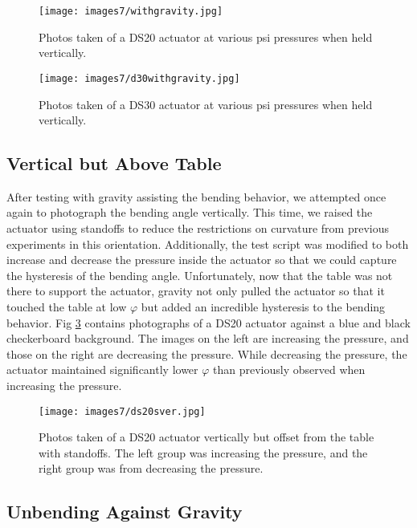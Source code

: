 \begin{figure}[h]
    \centering
     \texttt{[image: images7/withgravity.jpg]}
    \caption{Photos taken of a DS20 actuator at various psi pressures when held vertically.}
    \label{fig:withgravity}
\end{figure}

\begin{figure}[h]
    \centering
     \texttt{[image: images7/d30withgravity.jpg]}
    \caption{Photos taken of a DS30 actuator at various psi pressures when held vertically.}
    \label{fig:ds30withgravity}
\end{figure}

\clearpage
\subsection{Vertical but Above Table}

After testing with gravity assisting the bending behavior, we attempted once again to photograph the bending angle vertically. This time, we raised the actuator using standoffs to reduce the restrictions on curvature from previous experiments in this orientation. Additionally, the test script was modified to both increase and decrease the pressure inside the actuator so that we could capture the hysteresis of the bending angle. Unfortunately, now that the table was not there to support the actuator, gravity not only pulled the actuator so that it touched the table at low $\varphi$ but added an incredible hysteresis to the bending behavior. Fig \ref{fig:ds20sver} contains photographs of a DS20 actuator against a blue and black checkerboard background. The images on the left are increasing the pressure, and those on the right are decreasing the pressure. While decreasing the pressure, the actuator maintained significantly lower $\varphi$ than previously observed when increasing the pressure. 

\begin{figure}[h]
    \centering
     \texttt{[image: images7/ds20sver.jpg]}
    \caption{Photos taken of a DS20 actuator vertically but offset from the table with standoffs. The left group was increasing the pressure, and the right group was from decreasing the pressure.}
    \label{fig:ds20sver}
\end{figure}

\clearpage
\subsection{Unbending Against Gravity}

